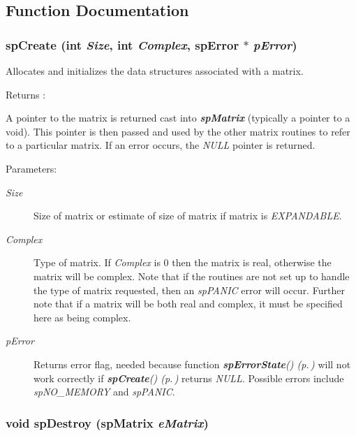 \subsection{Function Documentation}
\subsubsection{ sp\-Create (int {\em Size}, int {\em Complex}, {\bf sp\-Error} $\ast$ {\em p\-Error})}\label{spAllocate_8c_a11}


Allocates and initializes the data structures associated with a matrix.

\begin{Desc}
\item[Returns :]\par
 A pointer to the matrix is returned cast into {\em {\bf sp\-Matrix}} (typically a pointer to a void). This pointer is then passed and used by the other matrix routines to refer to a particular matrix. If an error occurs, the {\em NULL} pointer is returned.\end{Desc}
\begin{Desc}
\item[Parameters: ]\par
\begin{description}
\item[{\em 
Size}]Size of matrix or estimate of size of matrix if matrix is {\em EXPANDABLE}. \item[{\em 
Complex}]Type of matrix. If {\em Complex} is 0 then the matrix is real, otherwise the matrix will be complex. Note that if the routines are not set up to handle the type of matrix requested, then an {\em sp\-PANIC} error will occur. Further note that if a matrix will be both real and complex, it must be specified here as being complex. \item[{\em 
p\-Error}]Returns error flag, needed because function {\em {\bf sp\-Error\-State}() {\rm (p.\,\pageref{spAllocate_8c_a15})}} will not work correctly if {\em {\bf sp\-Create}() {\rm (p.\,\pageref{spAllocate_8c_a11})}} returns {\em NULL}. Possible errors include {\em sp\-NO\_\-MEMORY} and {\em sp\-PANIC}. \end{description}
\end{Desc}
\subsubsection{\setlength{\rightskip}{0pt plus 5cm}void sp\-Destroy ({\bf sp\-Matrix} {\em e\-Matrix})}\label{spAllocate_8c_a14}


